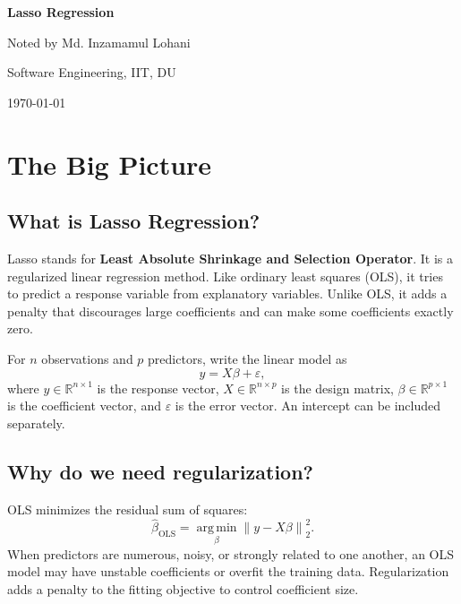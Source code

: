 \documentclass[11pt,a4paper]{article}
\numberwithin{equation}{section}
\newcommand{\topicname}{Lasso Regression}
\newcommand{\RR}{\mathbb{R}}
\newcommand{\norm}[1]{\left\lVert #1\right\rVert}
\newcommand{\argmin}{\operatorname*{arg\,min}}
\begin{document}
\begin{titlepage}
  \centering
  \vspace*{\fill}
  {\Huge\bfseries \topicname\par}
  \vspace{2.5em}
  {\large Noted by Md. Inzamamul Lohani\par}
  \vspace{0.4em}
  {\large Software Engineering, IIT, DU\par}
  \vspace{2em}
  {\large \today\par}
  \vspace*{\fill}
\end{titlepage}

\setcounter{page}{2}
\tableofcontents
\newpage

\section{The Big Picture}
\subsection{What is Lasso Regression?}
Lasso stands for \textbf{Least Absolute Shrinkage and Selection Operator}. It is a regularized linear regression method. Like ordinary least squares (OLS), it tries to predict a response variable from explanatory variables. Unlike OLS, it adds a penalty that discourages large coefficients and can make some coefficients exactly zero.

For $n$ observations and $p$ predictors, write the linear model as
\begin{equation}
  y=X\beta+\varepsilon,
\end{equation}
where $y\in\RR^{n\times1}$ is the response vector, $X\in\RR^{n\times p}$ is the design matrix, $\beta\in\RR^{p\times1}$ is the coefficient vector, and $\varepsilon$ is the error vector. An intercept can be included separately.

\subsection{Why do we need regularization?}
OLS minimizes the residual sum of squares:
\begin{equation}
  \hat\beta_{\mathrm{OLS}}=\argmin_\beta \norm{y-X\beta}_2^2.
\end{equation}
When predictors are numerous, noisy, or strongly related to one another, an OLS model may have unstable coefficients or overfit the training data. Regularization adds a penalty to the fitting objective to control coefficient size.
\end{document}
